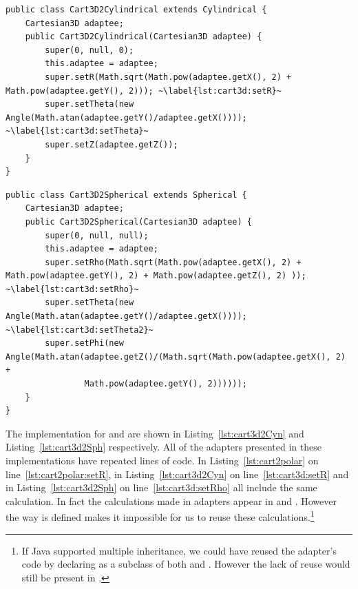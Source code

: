 \begin{lstlisting}[float, caption={Adapter for converting three dimensional cartesian coordinates to Cylindrical coordinates}, label={lst:cart3d2Cyn}]
public class Cart3D2Cylindrical extends Cylindrical {
	Cartesian3D adaptee;
	public Cart3D2Cylindrical(Cartesian3D adaptee) {
		super(0, null, 0);
		this.adaptee = adaptee;
		super.setR(Math.sqrt(Math.pow(adaptee.getX(), 2) + Math.pow(adaptee.getY(), 2))); ~\label{lst:cart3d:setR}~
		super.setTheta(new Angle(Math.atan(adaptee.getY()/adaptee.getX()))); ~\label{lst:cart3d:setTheta}~
		super.setZ(adaptee.getZ());
	}
}
\end{lstlisting}
\begin{lstlisting}[float, caption={Adapter for converting three dimensional cartesian coordinates to Spherical coordinates}, label={lst:cart3d2Sph}]
public class Cart3D2Spherical extends Spherical {
	Cartesian3D adaptee;
	public Cart3D2Spherical(Cartesian3D adaptee) {
		super(0, null, null);
		this.adaptee = adaptee;
		super.setRho(Math.sqrt(Math.pow(adaptee.getX(), 2) + Math.pow(adaptee.getY(), 2) + Math.pow(adaptee.getZ(), 2) )); ~\label{lst:cart3d:setRho}~
		super.setTheta(new Angle(Math.atan(adaptee.getY()/adaptee.getX()))); ~\label{lst:cart3d:setTheta2}~
		super.setPhi(new Angle(Math.atan(adaptee.getZ()/(Math.sqrt(Math.pow(adaptee.getX(), 2) +
				Math.pow(adaptee.getY(), 2))))));
	}
}
\end{lstlisting}

 
The implementation for  and  are shown in Listing~\ref{lst:cart3d2Cyn} and Listing~\ref{lst:cart3d2Sph} respectively. All of the adapters presented in these implementations have repeated lines of code. In Listing~\ref{lst:cart2polar} on line~\ref{lst:cart2polar:setR}, in Listing~\ref{lst:cart3d2Cyn} on line~\ref{lst:cart3d:setR} and in Listing~\ref{lst:cart3d2Sph} on line~\ref{lst:cart3d:setRho} all include the same calculation. In fact the calculations made in  adapters appear in  and . However the way  is defined makes it impossible for us to reuse these calculations.\footnote{If Java supported multiple inheritance, we could have reused the  adapter's code by declaring  as a subclass of both  and . However the lack of reuse would still be present in .} 

